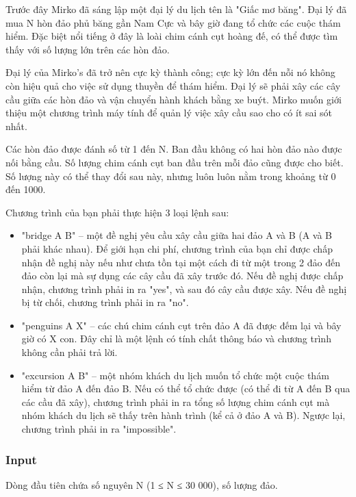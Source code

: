 



   Trước đây Mirko đã sáng lập một đại lý du lịch tên là "Giấc mơ băng". Đại lý đã mua N hòn đảo phủ băng gần Nam Cực và bây giờ đang tổ chức các cuộc thám hiểm. Đặc biệt nổi tiếng ở đây là loài chim cánh cụt hoàng đế, có thể được tìm thấy với số lượng lớn trên các hòn đảo.  

   Đại lý của Mirko's đã trở nên cực kỳ thành công; cực kỳ lớn đến nỗi nó không còn hiệu quả cho việc sử dụng thuyền để thám hiểm. Đại lý sẽ phải xây các cây cầu giữa các hòn đảo và vận chuyển hành khách bằng xe buýt. Mirko muốn giới thiệu một chương trình máy tính để quản lý việc xây cầu sao cho có ít sai sót nhất.  

   Các hòn đảo được đánh số từ 1 đến N. Ban đầu không có hai hòn đảo nào được nối bằng cầu. Số lượng chim cánh cụt ban đầu trên mỗi đảo cũng được cho biết. Số lượng này có thể thay đổi sau này, nhưng luôn luôn nằm trong khoảng từ 0 đến 1000.  

   Chương trình của bạn phải thực hiện 3 loại lệnh sau:  
\begin{itemize}
	\item     "bridge A B" – một đề nghị yêu cầu xây cầu giữa hai đảo A và B (A và B phải khác nhau). Để giới hạn chi phí, chương trình của bạn chỉ được chấp nhận đề nghị này nếu như chưa tồn tại một cách đi từ một trong 2 đảo đến đảo còn lại mà sự dụng các cây cầu đã xây trước đó. Nếu đề nghị được chấp nhận, chương trình phải in ra "yes", và sau đó cây cầu được xây. Nếu đề nghị bị từ chối, chương trình phải in ra "no".   
	\item     "penguins A X" – các chú chim cánh cụt trên đảo A đã được đếm lại và bây giờ có X con. Đây chỉ là một lệnh có tính chất thông báo và chương trình không cần phải trả lời.   
	\item     "excursion A B" – một nhóm khách du lịch muốn tổ chức một cuộc thám hiểm từ đảo A đến đảo B. Nếu có thể tổ chức được (có thể đi từ A đến B qua các cầu đã xây), chương trình phải in ra tổng số lượng chim cánh cụt mà nhóm khách du lịch sẽ thấy trên hành trình (kể cả ở đảo A và B). Ngược lại, chương trình phải in ra "impossible".   
\end{itemize}



\subsubsection{   Input  }

   Dòng đầu tiên chứa số nguyên N (1 ≤ N ≤ 30 000), số lượng đảo.  

